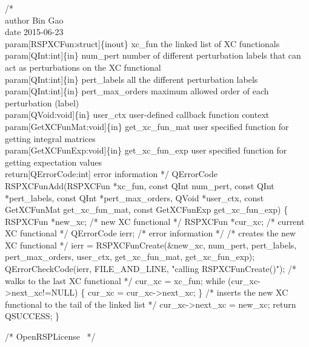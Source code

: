 /*%
    \\author Bin Gao
    \\date 2015-06-23
    \\param[RSPXCFun:struct]\{inout\} xc_fun the linked list of XC functionals
    \\param[QInt:int]\{in\} num_pert number of different perturbation labels that can
        act as perturbations on the XC functional
    \\param[QInt:int]\{in\} pert_labels all the different perturbation labels
    \\param[QInt:int]\{in\} pert_max_orders maximum allowed order of each perturbation (label)
    \\param[QVoid:void]\{in\} user_ctx user-defined callback function context
    \\param[GetXCFunMat:void]\{in\} get_xc_fun_mat user specified function for
        getting integral matrices
    \\param[GetXCFunExp:void]\{in\} get_xc_fun_exp user specified function for
        getting expectation values
    \\return[QErrorCode:int] error information
*/
QErrorCode RSPXCFunAdd(RSPXCFun *xc_fun,
                       const QInt num_pert,
                       const QInt *pert_labels,
                       const QInt *pert_max_orders,
                       QVoid *user_ctx,
                       const GetXCFunMat get_xc_fun_mat,
                       const GetXCFunExp get_xc_fun_exp)
\{
    RSPXCFun *new_xc;  /* new XC functional */
    RSPXCFun *cur_xc;  /* current XC functional */
    QErrorCode ierr;   /* error information */
    /* creates the new XC functional */
    ierr = RSPXCFunCreate(&new_xc,
                          num_pert,
                          pert_labels,
                          pert_max_orders,
                          user_ctx,
                          get_xc_fun_mat,
                          get_xc_fun_exp);
    QErrorCheckCode(ierr, FILE_AND_LINE, "calling RSPXCFunCreate()");
    /* walks to the last XC functional */
    cur_xc = xc_fun;
    while (cur_xc->next_xc!=NULL) \{
        cur_xc = cur_xc->next_xc;
    \}
    /* inserts the new XC functional to the tail of the linked list */
    cur_xc->next_xc = new_xc;
    return QSUCCESS;
\}

\nwendcode{}\endmoddef
/*
  \LA{}OpenRSPLicense~{\nwtagstyle{}}\RA{}
*/

